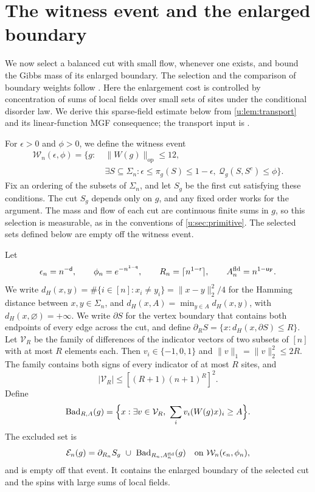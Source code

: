 \section{The witness event and the enlarged boundary}\label{u:sec:witness}

We now select a balanced cut with small flow, whenever one exists, and
bound the Gibbs mass of its enlarged boundary. The selection and the
comparison of boundary weights follow
\cite[Section~6, Proposition~7]{oai-typical-upper}. Here the enlargement
cost is controlled by concentration of sums of local fields over small
sets of sites under the conditional disorder law. We derive this
sparse-field estimate below from \cref{u:lem:transport} and its
linear-function MGF consequence; the transport input is
\cite[Corollary~3.10]{bogachev-kolesnikov-medvedev-2005}.

For $\epsilon>0$ and $\phi>0$, we define the witness event
\begin{equation}\label{u:eq:witness-event}
 \begin{split}
 \mathcal W_n(\epsilon,\phi)=\{g:\ &\|W(g)\|_{\mathrm{op}}\le12,\\
 &\exists S\subseteq\Sigma_n:\epsilon\le\pi_g(S)\le1-\epsilon,
                         \ \mathcal Q_g(S,S^c)\le\phi\}.
 \end{split}
\end{equation}
Fix an ordering of the subsets of $\Sigma_n$, and let $S_g$ be the first
cut satisfying these conditions. The cut $S_g$ depends only on $g$, and any fixed order
works for the argument. The mass and flow of each cut are continuous
finite sums in $g$, so this selection is measurable, as in the conventions
of \cref{u:sec:primitive}. The selected sets defined below are empty off
the witness event.

Let
\[
 \epsilon_n=n^{-\mathsf{d}},\qquad \phi_n=e^{-n^{1-\mathsf{q}}},\qquad
 R_n=\lceil n^{1-\mathsf{r}}\rceil,\qquad
 A_n^{\rm fld}=n^{1-\mathsf{u}_{\rm F}}.
\]
We write $d_H(x,y)=\#\{i\in[n]:x_i\ne y_i\}=\|x-y\|_2^2/4$
for the Hamming distance between $x,y\in\Sigma_n$, and
$d_H(x,A)=\min_{y\in A}d_H(x,y)$, with
$d_H(x,\varnothing)=+\infty$.
We write $\partial S$ for the vertex boundary that contains both endpoints
of every edge across the cut, and define
$\partial_R S=\{x:d_H(x,\partial S)\le R\}$. Let $\mathcal V_R$ be the family of differences of the indicator vectors
of two subsets of $[n]$ with at most $R$ elements each. Then $v_i\in\{-1,0,1\}$ and
$\|v\|_1=\|v\|_2^2\le2R$. The family contains both signs of every
indicator of at most $R$ sites, and
\begin{equation}\label{u:eq:field-direction-count}
 |\mathcal V_R|\le[(R+1)(n+1)^R]^2.
\end{equation}
Define
\[
 \mathrm{Bad}_{R,A}(g)=\Bigl\{x:\exists v\in\mathcal V_R,
                         \ \sum_i v_i(W(g)x)_i\ge A\Bigr\}.
\]
The excluded set is
\begin{equation}\label{u:eq:excluded-set}
 \mathcal E_n(g)=\partial_{R_n}S_g
           \ \cup\ \mathrm{Bad}_{R_n,A_n^{\rm fld}}(g)
 \quad\text{on }\mathcal W_n(\epsilon_n,\phi_n),
\end{equation}
and is empty off that event. It contains the enlarged boundary of the selected cut and the spins with large sums of local fields.

